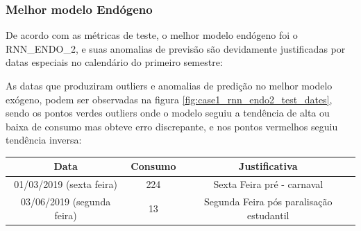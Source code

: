 \documentclass[	12pt, Times, openright, twoside, a4paper, english, brazil]{abntex2}
\begin{document}
            \begin{figure}[H]
            \end{figure}

    	    \subsubsection{Melhor modelo Endógeno}
            De acordo com as métricas de teste, o melhor modelo endógeno foi o RNN\_ENDO\_2, e suas anomalias de previsão são devidamente justificadas por datas especiais no calendário do primeiro semestre:
            
            \begin{figure}[H]
            \end{figure}
            
            As datas que produziram outliers e anomalias de predição no melhor modelo exógeno, podem ser observadas na figura \ref{fig:case1_rnn_endo2_test_dates}, sendo os pontos verdes outliers onde o modelo seguiu a tendência de alta ou baixa de consumo mas obteve erro discrepante, e nos pontos vermelhos seguiu tendência inversa:


                 \begin{tabular}{|c|c|c|}
                 \rowcolor{gray!50}
                 \hline 
             Data & Consumo & Justificativa\\ \hline    
            01/03/2019 (sexta feira)    & 224 & Sexta Feira pré - carnaval\\
             03/06/2019 (segunda feira)  &  13 & Segunda Feira pós paralisação estudantil\\ \hline \end{tabular}
\end{document}
